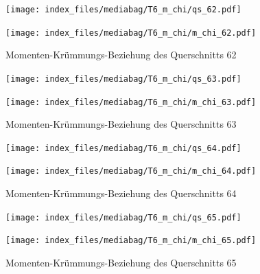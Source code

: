 \documentclass[
  11pt,
  letterpaper,
]{scrreprt}
\begin{document}
\begin{figure}[H]

\begin{minipage}{0.50\linewidth}
\texttt{[image: index\_files/mediabag/T6\_m\_chi/qs\_62.pdf]}\end{minipage}%
%
\begin{minipage}{0.50\linewidth}
\texttt{[image: index\_files/mediabag/T6\_m\_chi/m\_chi\_62.pdf]}\end{minipage}%

\caption{\label{fig-mchi_anhang}Momenten-Krümmungs-Beziehung des
Querschnitts 62}

\end{figure}%

\begin{figure}[H]

\begin{minipage}{0.50\linewidth}
\texttt{[image: index\_files/mediabag/T6\_m\_chi/qs\_63.pdf]}\end{minipage}%
%
\begin{minipage}{0.50\linewidth}
\texttt{[image: index\_files/mediabag/T6\_m\_chi/m\_chi\_63.pdf]}\end{minipage}%

\caption{\label{fig-mchi_anhang}Momenten-Krümmungs-Beziehung des
Querschnitts 63}

\end{figure}%

\begin{figure}[H]

\begin{minipage}{0.50\linewidth}
\texttt{[image: index\_files/mediabag/T6\_m\_chi/qs\_64.pdf]}\end{minipage}%
%
\begin{minipage}{0.50\linewidth}
\texttt{[image: index\_files/mediabag/T6\_m\_chi/m\_chi\_64.pdf]}\end{minipage}%

\caption{\label{fig-mchi_anhang}Momenten-Krümmungs-Beziehung des
Querschnitts 64}

\end{figure}%

\begin{figure}[H]

\begin{minipage}{0.50\linewidth}
\texttt{[image: index\_files/mediabag/T6\_m\_chi/qs\_65.pdf]}\end{minipage}%
%
\begin{minipage}{0.50\linewidth}
\texttt{[image: index\_files/mediabag/T6\_m\_chi/m\_chi\_65.pdf]}\end{minipage}%

\caption{\label{fig-mchi_anhang}Momenten-Krümmungs-Beziehung des
Querschnitts 65}

\end{figure}%
\end{document}
